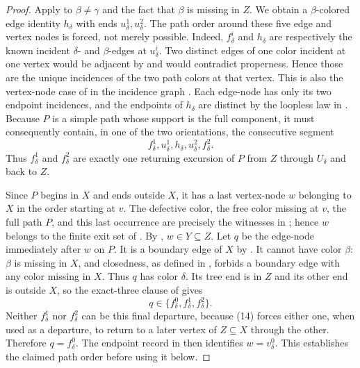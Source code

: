 \begin{proof}
Apply  to $\beta\ne\gamma$
and the fact that $\beta$ is missing in $Z$.  We obtain a
$\beta$-colored edge identity $h_\delta$ with ends
$u^1_\delta,u^2_\delta$.  The path order around these five edge and
vertex nodes is forced, not merely possible.  Indeed,
$f^i_\delta$ and $h_\delta$ are respectively the known incident
$\delta$- and $\beta$-edges at $u^i_\delta$.  Two distinct edges of one
color incident at one vertex would be adjacent by
 and would contradict properness.  Hence those
are the unique incidences of the two path colors at that vertex.  This is
also the vertex-node case of
 in the incidence graph
.  Each edge-node has only its two
endpoint incidences, and the endpoints of $h_\delta$ are distinct by
the loopless law in .  Because $P$ is a
simple path whose support is the full component, it must consequently
contain, in one of the two orientations, the consecutive segment
\[
 f^1_\delta, u^1_\delta, h_\delta, u^2_\delta, f^2_\delta. \tag{14}
\]
Thus $f^1_\delta$ and $f^2_\delta$ are exactly one returning excursion
of $P$ from $Z$ through $U_\delta$ and back to $Z$.

Since $P$ begins in $X$ and ends outside $X$, it has a last vertex-node
$w$ belonging to $X$ in the order starting at $v$.  The defective color,
the free color missing at $v$, the full path $P$, and this last occurrence
are precisely the witnesses in ; hence $w$
belongs to the finite exit set of .
By , $w\in Y\subseteq Z$.  Let
$q$ be the edge-node immediately after $w$ on $P$.  It is a boundary
edge of $X$ by .  It cannot have color $\beta$:
$\beta$ is missing in $X$,
and closedness, as defined in , forbids a
boundary edge with any color missing in $X$.  Thus $q$ has color
$\delta$.  Its tree end is in $Z$ and its other end is outside $X$, so
the exact-three clause of  gives
\[
 q\in\{f^0_\delta,f^1_\delta,f^2_\delta\}.
\]
Neither $f^1_\delta$ nor $f^2_\delta$ can be this final departure,
because (14) forces either one, when used as a departure, to return to a
later vertex of $Z\subseteq X$ through the other.  Therefore
$q=f^0_\delta$.  The endpoint record in
 then identifies $w=v^0_\delta$.  This
establishes the claimed path order before using it below.


\end{proof}

